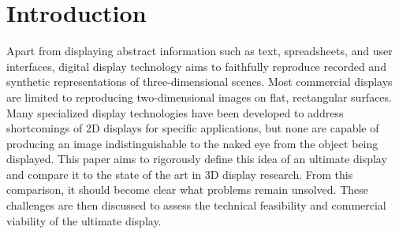 \section{Introduction}
Apart from displaying abstract information such as text, spreadsheets, and user interfaces, digital display technology aims to faithfully reproduce recorded and synthetic representations of three-dimensional scenes. Most commercial displays are limited to reproducing two-dimensional images on flat, rectangular surfaces. Many specialized display technologies have been developed to address shortcomings of 2D displays for specific applications, but none are capable of producing an image indistinguishable to the naked eye from the object being displayed. This paper aims to rigorously define this idea of an ultimate display and compare it to the state of the art in 3D display research. From this comparison, it should become clear what problems remain unsolved. These challenges are then discussed to assess the technical feasibility and commercial viability of the ultimate display.